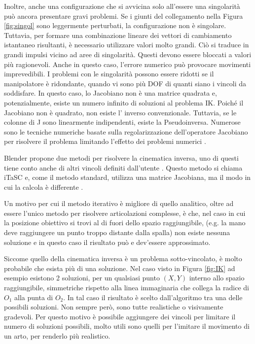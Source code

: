 Inoltre, anche una configurazione che si avvicina solo all'essere una singolarità può ancora presentare gravi problemi.
Se i giunti del collegamento nella Figura \ref{fig:singol} sono leggermente perturbati, la configurazione non è singolare.
Tuttavia, per formare una combinazione lineare dei vettori di cambiamento istantaneo risultanti, è necessario utilizzare valori molto grandi.
Ciò si traduce in grandi impulsi vicino ad aree di singolarità.
Questi devono essere bloccati a valori più ragionevoli.
Anche in questo caso, l'errore numerico può provocare movimenti imprevedibili.
I problemi con le singolarità possono essere ridotti se il manipolatore è ridondante, quando vi sono più DOF di quanti siano i vincoli da soddisfare.
In questo caso, lo Jacobiano non è una matrice quadrata e, potenzialmente, esiste un numero infinito di soluzioni al problema IK.
Poiché il Jacobiano  non è quadrato, non esiste l’ inverso convenzionale.
Tuttavia, se le colonne di J sono linearmente indipendenti, esiste la Pseudoinversa.
Numerose sono le tecniche numeriche basate sulla regolarizzazione dell’operatore Jacobiano per risolvere il problema limitando l’effetto dei problemi numerici \cite{buss2006} \cite{buss2005}.

Blender propone due metodi per risolvere la cinematica inversa, uno di questi tiene conto anche di altri vincoli definiti dall'utente \cite{blendDoc}. Questo metodo si chiama iTaSC e, come il metodo standard, utilizza una matrice Jacobiana, ma il modo in cui la calcola è differente \cite{blendWiki}.

Un motivo per cui il metodo iterativo è migliore di quello analitico, oltre ad essere l'unico metodo per risolvere articolazioni complesse, è che, nel caso in cui la posizione obiettivo si trovi al di fuori dello spazio raggiungibile, (e.g. la mano deve raggiungere un punto troppo distante dalla spalla) non esiste nessuna soluzione e in questo caso il risultato può e dev'essere approssimato.

Siccome quello della cinematica inversa è un problema sotto-vincolato, è molto probabile che esista più di una soluzione. Nel caso visto in Figura \ref{fig:IK} ad esempio esistono 2 soluzioni, per un qualsiasi punto $(X,Y)$ interno allo spazio raggiungibile, simmetriche rispetto alla linea immaginaria che collega la radice di $O_1$ alla punta di $O_2$.
In tal caso il risultato è scelto dall'algoritmo tra una delle possibili soluzioni. Non sempre però, sono tutte realistiche o visivamente gradevoli.
Per questo motivo è possibile aggiungere dei vincoli per limitare il numero di soluzioni possibili, molto utili sono quelli per l'imitare il movimento di un arto, per renderlo più realistico.


